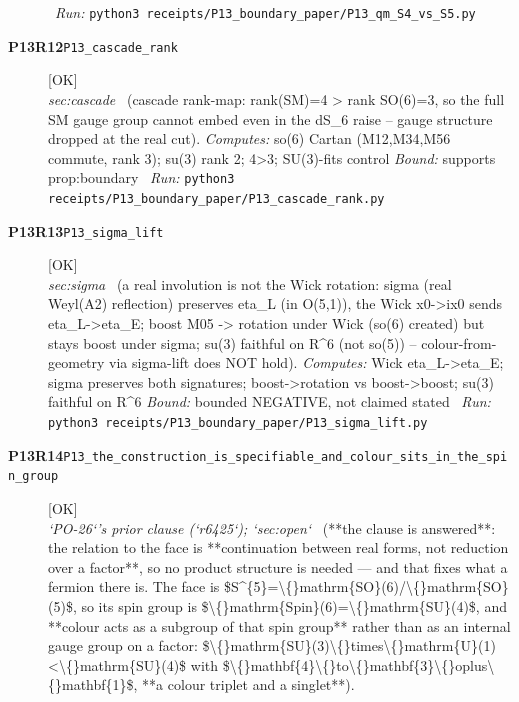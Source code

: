 \begin{description}
\ \emph{Run:} \texttt{python3 receipts/P13\_boundary\_paper/P13\_qm\_S4\_vs\_S5.py}
\item[\rcptlabel{P13_cascade_rank}{P13R12}\textbf{P13R12}\quad\texttt{P13\_cascade\_rank}]\hfill\textsf{[OK]}\\
\textit{sec:cascade} \ (cascade rank-map: rank(SM)=4 > rank SO(6)=3, so the full SM gauge group cannot embed even in the dS\_6 raise -- gauge structure dropped at the real cut). 
\emph{Computes:} so(6) Cartan (M12,M34,M56 commute, rank 3); su(3) rank 2; 4>3; SU(3)-fits control
 \emph{Bound:} supports prop:boundary
\ \emph{Run:} \texttt{python3 receipts/P13\_boundary\_paper/P13\_cascade\_rank.py}
\item[\rcptlabel{P13_sigma_lift}{P13R13}\textbf{P13R13}\quad\texttt{P13\_sigma\_lift}]\hfill\textsf{[OK]}\\
\textit{sec:sigma} \ (a real involution is not the Wick rotation: sigma (real Weyl(A2) reflection) preserves eta\_L (in O(5,1)), the Wick x0->ix0 sends eta\_L->eta\_E; boost M05 -> rotation under Wick (so(6) created) but stays boost under sigma; su(3) faithful on R\textasciicircum{}6 (not so(5)) -- colour-from-geometry via sigma-lift does NOT hold). 
\emph{Computes:} Wick eta\_L->eta\_E; sigma preserves both signatures; boost->rotation vs boost->boost; su(3) faithful on R\textasciicircum{}6
 \emph{Bound:} bounded NEGATIVE, not claimed stated
\ \emph{Run:} \texttt{python3 receipts/P13\_boundary\_paper/P13\_sigma\_lift.py}
\item[\rcptlabel{P13_the_construction_is_specifiable_and_colour_sits_in_the_spin_group}{P13R14}\textbf{P13R14}\quad\texttt{P13\_the\_construction\_is\_specifiable\_and\_colour\_sits\_in\_the\_spin\_group}]\hfill\textsf{[OK]}\\
\textit{`PO-26`'s prior clause (`r6425`); `sec:open`} \ (**the clause is answered**: the relation to the face is **continuation between real forms, not reduction over a factor**, so no product structure is needed --- and that fixes what a fermion there is. The face is \$S\textasciicircum{}\{5\}=\textbackslash\{\}mathrm\{SO\}(6)/\textbackslash\{\}mathrm\{SO\}(5)\$, so its spin group is \$\textbackslash\{\}mathrm\{Spin\}(6)=\textbackslash\{\}mathrm\{SU\}(4)\$, and **colour acts as a subgroup of that spin group** rather than as an internal gauge group on a factor: \$\textbackslash\{\}mathrm\{SU\}(3)\textbackslash\{\}times\textbackslash\{\}mathrm\{U\}(1)<\textbackslash\{\}mathrm\{SU\}(4)\$ with \$\textbackslash\{\}mathbf\{4\}\textbackslash\{\}to\textbackslash\{\}mathbf\{3\}\textbackslash\{\}oplus\textbackslash\{\}mathbf\{1\}\$, **a colour triplet and a singlet**). 

\end{description}
